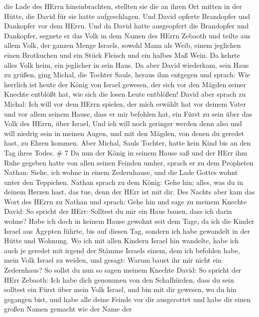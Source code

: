 die Lade des HErrn hineinbrachten, stellten sie die an ihren Ort mitten
in der Hütte, die David für sie hatte aufgeschlagen. Und David opferte
Brandopfer und Dankopfer vor dem HErrn.  Und da David hatte
ausgeopfert die Brandopfer und Dankopfer, segnete er das Volk in dem
Namen des HErrn Zebaoth  und teilte aus allem Volk, der
ganzen Menge Israels, sowohl Mann als Weib, einem jeglichen einen
Brotkuchen und ein Stück Fleisch und ein halbes Maß Wein. Da kehrte
alles Volk heim, ein jeglicher in sein Haus.  Da aber David
wiederkam, sein Haus zu grüßen, ging Michal, die Tochter Sauls, heraus
ihm entgegen und sprach: Wie herrlich ist heute der König von Israel
gewesen, der sich vor den Mägden seiner Knechte entblößt hat, wie sich
die losen Leute entblößen!  David aber sprach zu Michal:
Ich will vor dem HErrn spielen, der mich erwählt hat vor deinem Vater
und vor allem seinem Hause, dass er mir befohlen hat, ein Fürst zu sein
über das Volk des HErrn, über Israel,  Und ich will noch
geringer werden denn also und will niedrig sein in meinen Augen, und mit
den Mägden, von denen du geredet hast, zu Ehren kommen. 
Aber Michal, Sauls Tochter, hatte kein Kind bis an den Tag ihres Todes.
\# 7  Da nun der König in seinem Hause saß und der HErr ihm
Ruhe gegeben hatte von allen seinen Feinden umher,  sprach
er zu dem Propheten Nathan: Siehe, ich wohne in einem Zedernhause, und
die Lade Gottes wohnt unter den Teppichen.  Nathan sprach zu
dem König: Gehe hin; alles, was du in deinem Herzen hast, das tue, denn
der HErr ist mit dir.  Des Nachts aber kam das Wort des
HErrn zu Nathan und sprach:  Gehe hin und sage zu meinem
Knechte David: So spricht der HErr: Solltest du mir ein Haus bauen, dass
ich darin wohne?  Habe ich doch in keinem Hause gewohnt seit
dem Tage, da ich die Kinder Israel aus Ägypten führte, bis auf diesen
Tag, sondern ich habe gewandelt in der Hütte und Wohnung. 
Wo ich mit allen Kindern Israel hin wandelte, habe ich auch je geredet
mit irgend der Stämme Israels einem, dem ich befohlen habe, mein Volk
Israel zu weiden, und gesagt: Warum bauet ihr mir nicht ein Zedernhaus?
 So sollst du nun so sagen meinem Knechte David: So spricht
der HErr Zebaoth: Ich habe dich genommen von den Schafhürden, dass du
sein solltest ein Fürst über mein Volk Israel,  und bin mit
dir gewesen, wo du hin gegangen bist, und habe alle deine Feinde vor dir
ausgerottet und habe dir einen großen Namen gemacht wie der Name der
